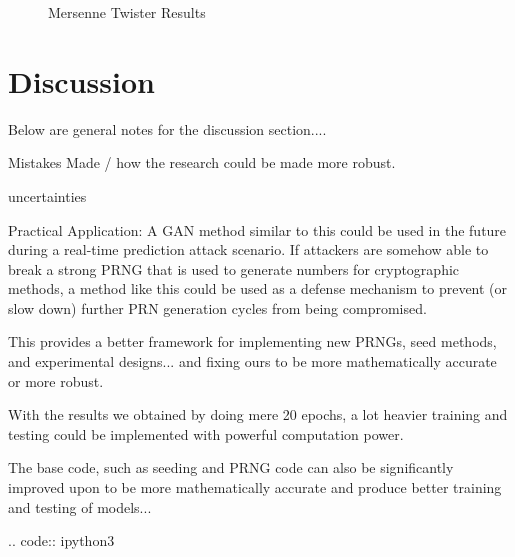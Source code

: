 \documentclass[conference]{IEEEtran}
\begin{document}
\begin{figure}[H]
\centering
{}
\qquad
{}
\caption{Mersenne Twister Results}
\label{fig:MT}
\end{figure}

\section{Discussion}

Below are general notes for the discussion section....

Mistakes Made / how the research could be made more robust.

uncertainties

Practical Application:
A GAN method similar to this could be used in the future during a real-time prediction attack scenario. If attackers are somehow able to break a strong PRNG that is used to generate numbers for cryptographic methods, a method like this could be used as a defense mechanism to prevent (or slow down) further PRN generation cycles from being compromised.

This provides a better framework for implementing new PRNGs, seed methods, and experimental designs... and fixing ours to be more mathematically accurate or more robust.

With the results we obtained by doing mere 20 epochs, a lot heavier training and testing could be implemented with powerful computation power.

The base code, such as seeding and PRNG code can also be significantly improved upon to be more mathematically accurate and produce better training and testing of models...


.. code:: ipython3

    
\end{document}
